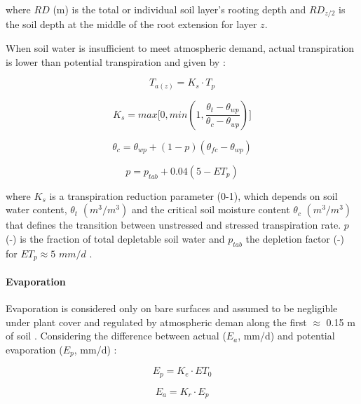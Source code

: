 \documentclass[]{article}
\let\oldparagraph\paragraph
\renewcommand{\paragraph}[1]{\oldparagraph{#1}\mbox{}}
\begin{document}
where \(RD\) (m) is the total or individual soil layer's rooting depth
and \(RD_{z/2}\) is the soil depth at the middle of the root extension
for layer \(z\).

When soil water is insufficient to meet atmospheric demand, actual
transpiration is lower than potential transpiration and given by
\citep{Sheikh2009}:

\begin{equation}
T_{a(z)} = K_s \cdot T_p
\label{eq:Taz}  
\end{equation}

\begin{equation}
K_s= max \Big[ 0, min(1, \frac{\theta_t - \theta_{wp} }{ \theta_c - \theta_{wp} }) \Big]
\label{eq:Ks}  
\end{equation}

\begin{equation}
\theta_c = \theta_{wp} + (1 - p)(\theta_{fc}- \theta_{wp}) 
\label{eq:theta_c}  
\end{equation}

\begin{equation}
p = p_{tab} + 0.04(5-ET_p)
\label{eq:p}  
\end{equation}

where \(K_s\) is a transpiration reduction parameter (0-1), which
depends on soil water content, \(\theta_t\) \((m^3/m^3)\) and the
critical soil moisture content \(\theta_c\) \((m^3/m^3)\) that defines
the transition between unstressed and stressed transpiration rate. \(p\)
(-) is the fraction of total depletable soil water and \(p_{tab}\) the
depletion factor (-) for \(ET_p \approx 5\) \(mm/d\) \citep[Table no.
22]{Allen1998}.

\hypertarget{evaporation}{%
\paragraph{Evaporation}\label{evaporation}}

Evaporation is considered only on bare surfaces and assumed to be
negligible under plant cover and regulated by atmospheric deman along
the first \(\approx\) 0.15 m of soil \citep{Sheikh2009}. Considering the
difference between actual (\(E_a\), mm/d) and potential evaporation
(\(E_p\), mm/d) \citep{Allen1998}:

\begin{equation}
E_p=K_e \cdot ET_0
\label{eq:Ep}  
\end{equation}

\begin{equation}
E_a=K_r \cdot E_p
\label{eq:Ea}  
\end{equation}
\end{document}

